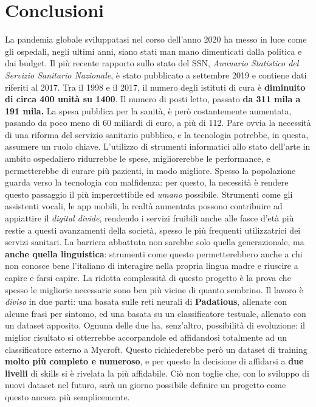 \chapter{Conclusioni}
\label{chap:conclusioni}
La pandemia globale sviluppatasi nel corso dell'anno 2020 ha messo in luce come gli ospedali, negli ultimi anni, siano stati man mano dimenticati dalla politica e dai budget. Il più recente rapporto sullo stato del SSN, \textit{Annuario Statistico del Servizio Sanitario Nazionale}, è stato pubblicato a settembre 2019 e contiene dati riferiti al 2017.
Tra il 1998 e il 2017, il numero degli istituti di cura è \textbf{diminuito di circa 400 unità su 1400}. Il numero di posti letto, passato \textbf{da 311 mila a 191 mila.} La spesa pubblica per la sanità, è però costantemente aumentata, pasando da poco meno di 60 miliardi di euro, a più di 112. \cite{article:tagli-ospedali} Pare ovvia la necessità di una riforma del servizio sanitario pubblico, e la tecnologia potrebbe, in questa, assumere un ruolo chiave. L'utilizzo di strumenti informatici allo stato dell'arte in ambito ospedaliero ridurrebbe le spese, migliorerebbe le performance, e permetterebbe di curare più pazienti, in modo migliore.
Spesso la popolazione guarda verso la tecnologia con malfidenza: per questo, la necessità è rendere questo passaggio il più impercettibile ed \textit{umano} possibile. Strumenti come gli assistenti vocali, le app mobili, la realtà aumentata possono contribuire ad appiattire il \textit{digital divide}, rendendo i servizi fruibili anche alle fasce d'età più restie a questi avanzamenti della società, spesso le più frequenti utilizzatrici dei servizi sanitari.
La barriera abbattuta non sarebbe solo quella generazionale, ma \textbf{anche quella linguistica}: strumenti come questo permetterebbero anche a chi non conosce bene l'italiano di interagire nella propria lingua madre e riuscire a capire e farsi capire.
La ridotta complessità di questo progetto è la prova che spesso le migliorie necessarie sono ben più vicine di quanto sembrino.
Il lavoro è \textit{diviso} in due parti: una basata sulle reti neurali di \textbf{Padatious}, allenate con alcune frasi per sintomo, ed una basata su un classificatore testuale, allenato con un dataset apposito. Ognuna delle due ha, senz'altro, possibilità di evoluzione: il miglior risultato si otterrebbe accorpandole ed affidandosi totalmente ad un classificatore esterno a Mycroft. Questo richiederebbe però un dataset di training \textbf{molto più completo e numeroso}, e per questo la decisione di affidarsi a \textbf{due livelli} di skills si è rivelata la più affidabile. Ciò non toglie che, con lo sviluppo di nuovi dataset nel futuro, sarà un giorno possibile definire un progetto come questo ancora più semplicemente.
